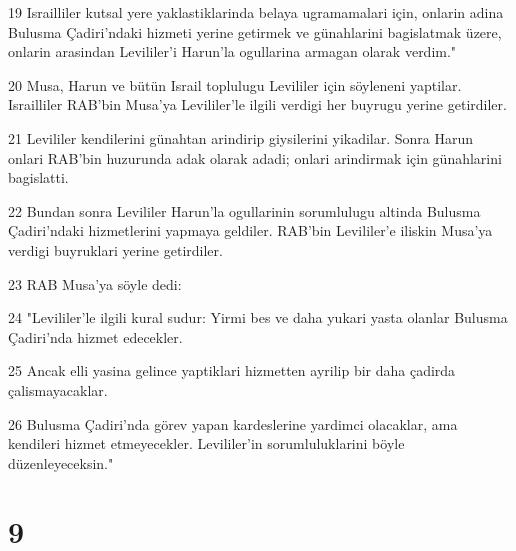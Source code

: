 \par 19 Israilliler kutsal yere yaklastiklarinda belaya ugramamalari için, onlarin adina Bulusma Çadiri'ndaki hizmeti yerine getirmek ve günahlarini bagislatmak üzere, onlarin arasindan Levililer'i Harun'la ogullarina armagan olarak verdim."
\par 20 Musa, Harun ve bütün Israil toplulugu Levililer için söyleneni yaptilar. Israilliler RAB'bin Musa'ya Levililer'le ilgili verdigi her buyrugu yerine getirdiler.
\par 21 Levililer kendilerini günahtan arindirip giysilerini yikadilar. Sonra Harun onlari RAB'bin huzurunda adak olarak adadi; onlari arindirmak için günahlarini bagislatti.
\par 22 Bundan sonra Levililer Harun'la ogullarinin sorumlulugu altinda Bulusma Çadiri'ndaki hizmetlerini yapmaya geldiler. RAB'bin Levililer'e iliskin Musa'ya verdigi buyruklari yerine getirdiler.
\par 23 RAB Musa'ya söyle dedi:
\par 24 "Levililer'le ilgili kural sudur: Yirmi bes ve daha yukari yasta olanlar Bulusma Çadiri'nda hizmet edecekler.
\par 25 Ancak elli yasina gelince yaptiklari hizmetten ayrilip bir daha çadirda çalismayacaklar.
\par 26 Bulusma Çadiri'nda görev yapan kardeslerine yardimci olacaklar, ama kendileri hizmet etmeyecekler. Levililer'in sorumluluklarini böyle düzenleyeceksin."

\chapter{9}

